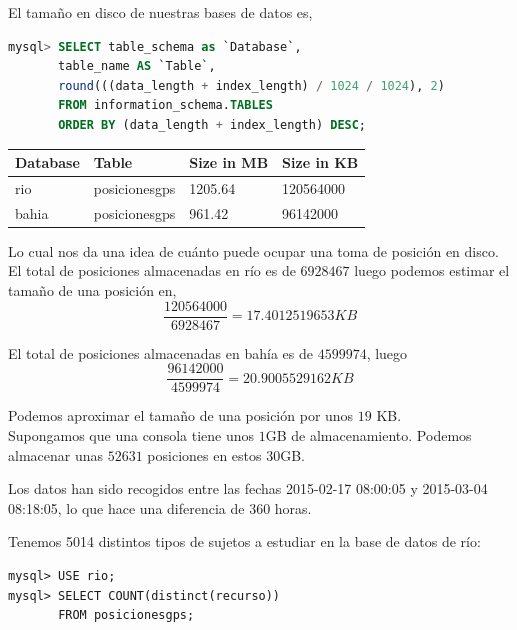 \documentclass[a4paper, 12pt]{article}
\begin{document}
El tama\~no en disco de nuestras bases de datos es,

\begin{lstlisting}[language=sql, basicstyle=\small, columns=fullflexible]
mysql> SELECT table_schema as `Database`, 
	   table_name AS `Table`,  
	   round(((data_length + index_length) / 1024 / 1024), 2) 
	   FROM information_schema.TABLES  
	   ORDER BY (data_length + index_length) DESC;

\end{lstlisting}

\begin{center}

	\begin{tabular}{| l | l | l | l |}
	\hline
	Database & Table & Size in MB & Size in KB \\
	\hline
	rio & posicionesgps & 1205.64 & 120564000 \\
	bahia & posicionesgps & 961.42 & 96142000 \\
	\hline
	\end{tabular}
\end{center}

Lo cual nos da una idea de cu\'anto puede ocupar una toma de posici\'on en disco.\\

El total de posiciones almacenadas en r\'io es de $6928467$ luego podemos estimar el tama\~no de una posici\'on en, \\
$$\frac{120564000}{6928467} = 17.4012519653 KB$$

El total de posiciones almacenadas en bah\'ia es de $4599974$, luego\\
$$\frac{96142000}{4599974} = 20.9005529162 KB$$

Podemos aproximar el tama\~no de una posici\'on por unos $19$ KB. \\

Supongamos que una consola tiene unos $1$GB de almacenamiento. Podemos almacenar unas $52631$ posiciones en estos 30GB. 

Los datos han sido recogidos entre las fechas 2015-02-17 08:00:05 y 2015-03-04 08:18:05, lo que hace una diferencia de 360 horas.

Tenemos 5014 distintos tipos de sujetos a estudiar en la base de datos de r\'io:

\begin{lstlisting}
mysql> USE rio;
mysql> SELECT COUNT(distinct(recurso)) 
	   FROM posicionesgps;
\end{lstlisting}
\end{document}
